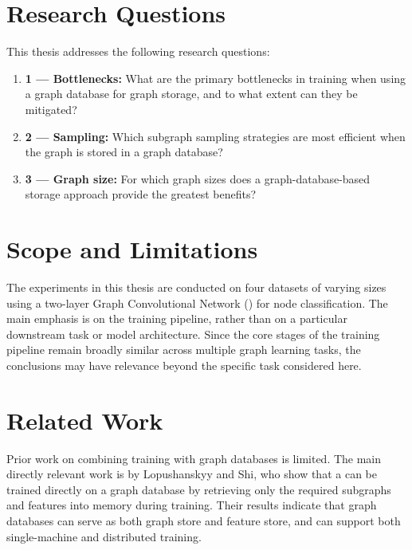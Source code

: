 \section{Research Questions}\label{sec:rq}

This thesis addresses the following research questions:

\begin{enumerate}
    \item \textbf{1 --- Bottlenecks:} What are the primary bottlenecks
    in  training when using a graph database for graph storage, and to
    what extent can they be mitigated?

    \item \textbf{2 --- Sampling:} Which subgraph sampling strategies
    are most efficient when the graph is stored in a graph database?

    \item \textbf{3 --- Graph size:} For which graph sizes does a
    graph-database-based storage approach provide the greatest benefits?
\end{enumerate}


\section{Scope and Limitations}\label{sec:scope}

The experiments in this thesis are conducted on four datasets of varying sizes using a
two-layer Graph Convolutional Network () for node classification. The
main emphasis is on the training pipeline, rather than on a particular downstream task
or model architecture. Since the core stages of the training pipeline remain broadly
similar across multiple graph learning tasks, the conclusions may have relevance beyond
the specific task considered here.


\section{Related Work}\label{sec:related_work}

Prior work on combining  training with graph databases is limited. The
main directly relevant work is by Lopushanskyy and Shi, who show that a 
can be trained directly on a graph database by retrieving only the required subgraphs
and features into memory during training. Their results indicate that graph databases
can serve as both graph store and feature store, and can support both single-machine
and distributed training.

